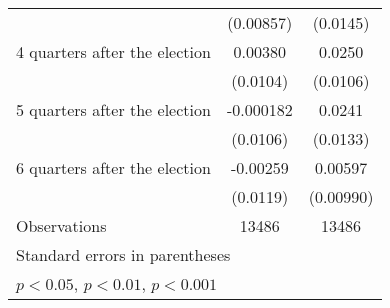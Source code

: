 \begin{table}[htbp]
\begin{tabular}{l*{2}{c}}
                    &   (0.00857)         &    (0.0145)         \\
[1em]
 4 quarters after the election&     0.00380         &      0.0250\sym{*}  \\
                    &    (0.0104)         &    (0.0106)         \\
[1em]
 5 quarters after the election&   -0.000182         &      0.0241         \\
                    &    (0.0106)         &    (0.0133)         \\
[1em]
 6 quarters after the election&    -0.00259         &     0.00597         \\
                    &    (0.0119)         &   (0.00990)         \\
\hline
Observations        &       13486         &       13486         \\
\hline\hline
\multicolumn{3}{l}{\footnotesize Standard errors in parentheses}\\
\multicolumn{3}{l}{\footnotesize \sym{*} \(p<0.05\), \sym{**} \(p<0.01\), \sym{***} \(p<0.001\)}\\
\end{tabular}
\end{table}
